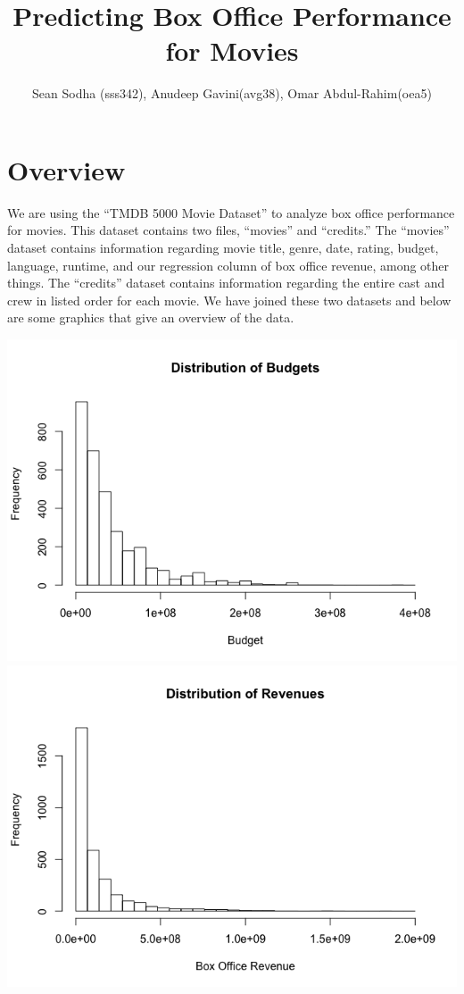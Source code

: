 \documentclass{article}
\title{Predicting Box Office Performance for Movies}
\author{Sean Sodha (sss342), Anudeep Gavini(avg38), Omar Abdul-Rahim(oea5)}
\begin{document}
\maketitle

\section{Overview}

    We are using the “TMDB 5000 Movie Dataset” to analyze box office performance for movies. This dataset contains two files, “movies” and “credits.” The “movies” dataset contains information regarding movie title, genre, date, rating, budget, language, runtime, and our regression column of box office revenue, among other things. The “credits” dataset contains information regarding the entire cast and crew in listed order for each movie. We have joined these two datasets and below are some graphics that give an overview of the data. 
    
    \includegraphics[scale=.25]{new_budget.png}
    \includegraphics[scale=.25]{new_rating.png}
    
\end{document}
